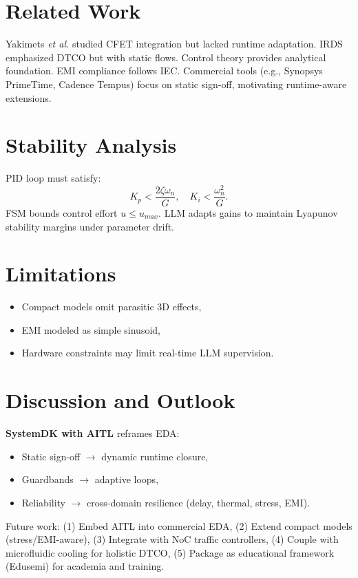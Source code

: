 \documentclass[conference]{IEEEtran}
\begin{document}
\section{Related Work}
Yakimets \textit{et al.} studied CFET integration but lacked runtime adaptation.
IRDS emphasized DTCO but with static flows.
Control theory provides analytical foundation.
EMI compliance follows IEC.
Commercial tools (e.g., Synopsys PrimeTime, Cadence Tempus) focus on static sign-off, motivating runtime-aware extensions.

\section{Stability Analysis}
PID loop must satisfy:
\begin{equation}
K_p < \frac{2\zeta\omega_n}{G}, \quad K_i < \frac{\omega_n^2}{G}.
\end{equation}
FSM bounds control effort $u \le u_{max}$.
LLM adapts gains to maintain Lyapunov stability margins under parameter drift.

\section{Limitations}
\begin{itemize}
  \item Compact models omit parasitic 3D effects,
  \item EMI modeled as simple sinusoid,
  \item Hardware constraints may limit real-time LLM supervision.
\end{itemize}

\section{Discussion and Outlook}
\textbf{SystemDK with AITL} reframes EDA:
\begin{itemize}
  \item Static sign-off $\to$ dynamic runtime closure,
  \item Guardbands $\to$ adaptive loops,
  \item Reliability $\to$ cross-domain resilience (delay, thermal, stress, EMI).
\end{itemize}
Future work:
(1) Embed AITL into commercial EDA,
(2) Extend compact models (stress/EMI-aware),
(3) Integrate with NoC traffic controllers,
(4) Couple with microfluidic cooling for holistic DTCO,
(5) Package as educational framework (Edusemi) for academia and training.
\end{document}
